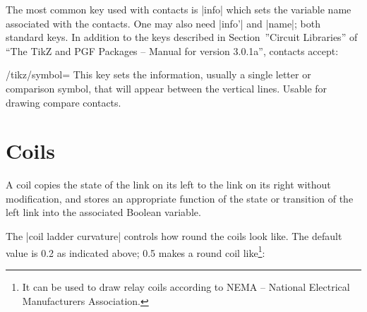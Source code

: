 \documentclass[a4paper]{ltxdoc}
\begin{document}
The most common key used with contacts is |info| which sets the variable name associated with the contacts. One may also need |info'| and |name|; both standard keys. In addition to the keys described in Section~''Circuit Libraries'' of ``The TikZ and PGF Packages -- Manual for version 3.0.1a'', contacts accept:
\begin{key}{/tikz/symbol=}
This key sets the information, usually a single letter or comparison symbol, that will appear between the vertical lines. Usable for drawing compare contacts.
\end{key}


\section{Coils}

A coil copies the state of the link on its left to the link on its right without modification, and stores an appropriate function of the state or transition of the left link into the associated Boolean variable. 

\begin{codeexample}[]
\end{codeexample}
The |coil ladder curvature| controls how round the coils look like. The default value is 0.2 as indicated above; 0.5 makes a round coil like\footnote{It can be used to draw relay coils according to NEMA -- National Electrical Manufacturers Association.}:
\end{document}
